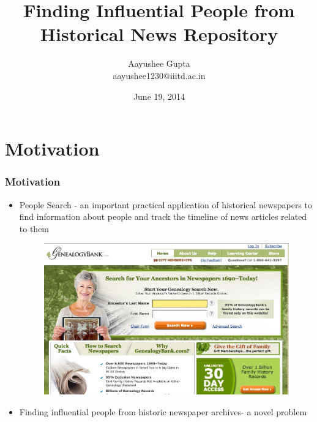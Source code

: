 \documentclass{beamer}
\title{Finding Influential People from Historical News Repository}
\author{Aayushee Gupta\\{\tiny aayushee1230@iiitd.ac.in}}
\institute{Indraprastha Institute of Information Technology}
\date{June 19, 2014}
\begin{document}
\maketitle


\section{Motivation}
\begin{frame}
\frametitle{Motivation}
 
\begin{itemize}
\item People Search - an important practical application of historical newspapers to find information about people and track the timeline of news articles related to them
\begin{figure}[ht]
\begin{center}
\includegraphics[scale=0.2]{genealogy.jpg}
\end{center}
\end{figure}
\item Finding influential people from historic newspaper archives- a novel problem
\end{itemize}
\end{frame}


\end{document}
